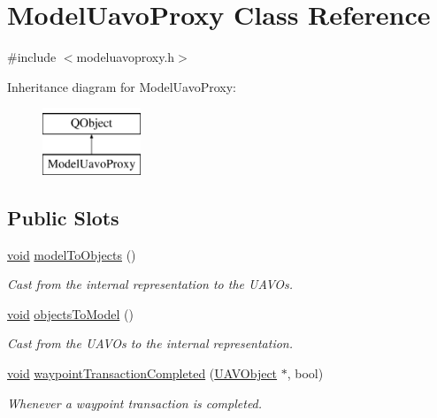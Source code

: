 \hypertarget{class_model_uavo_proxy}{\section{Model\-Uavo\-Proxy Class Reference}
\label{class_model_uavo_proxy}
}


{\ttfamily \#include $<$modeluavoproxy.\-h$>$}

Inheritance diagram for Model\-Uavo\-Proxy\-:\begin{figure}[H]
\begin{center}
\leavevmode
\includegraphics[height=2.000000cm]{class_model_uavo_proxy}
\end{center}
\end{figure}
\subsection*{Public Slots}
\begin{DoxyCompactItemize}
\item 
\hyperlink{group___u_a_v_objects_plugin_ga444cf2ff3f0ecbe028adce838d373f5c}{void} \hyperlink{group___o_p_map_plugin_ga3fdf6b22d36aa34b0eb480ab41cf696e}{model\-To\-Objects} ()
\begin{DoxyCompactList}\small\item\em Cast from the internal representation to the U\-A\-V\-Os. \end{DoxyCompactList}\item 
\hyperlink{group___u_a_v_objects_plugin_ga444cf2ff3f0ecbe028adce838d373f5c}{void} \hyperlink{group___o_p_map_plugin_gadf2e7f7ca1a0ae5d380c107e7dbf9132}{objects\-To\-Model} ()
\begin{DoxyCompactList}\small\item\em Cast from the U\-A\-V\-Os to the internal representation. \end{DoxyCompactList}\item 
\hyperlink{group___u_a_v_objects_plugin_ga444cf2ff3f0ecbe028adce838d373f5c}{void} \hyperlink{group___o_p_map_plugin_ga428d73f0e25b47749d707e5c6bd5d34f}{waypoint\-Transaction\-Completed} (\hyperlink{class_u_a_v_object}{U\-A\-V\-Object} $\ast$, bool)
\begin{DoxyCompactList}\small\item\em Whenever a waypoint transaction is completed. \end{DoxyCompactList}\end{DoxyCompactItemize}
